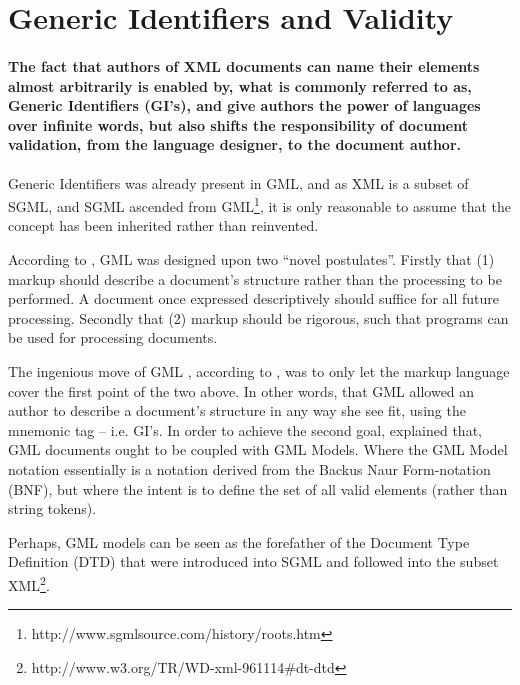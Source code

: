 \documentclass{scrreprt}
\begin{document}
\section{Generic Identifiers and Validity}
\label{sec:theory:generic-identifiers-and-validity}

\paragraph{The fact that authors of XML documents can name their elements almost arbitrarily is enabled by, what is commonly referred to as, Generic Identifiers (GI's), and give authors the power of languages over infinite words, but also shifts the responsibility of document validation, from the language designer, to the document author.}

Generic Identifiers was already present in GML, and as XML is a subset of SGML, and SGML ascended from GML\footnote{http://www.sgmlsource.com/history/roots.htm}, it is only reasonable to assume that the concept has been inherited rather than reinvented.

According to \citet{goldfarb}, GML was designed upon two ``novel postulates''. Firstly that (1) markup should describe a document's structure rather than the processing to be performed. A document once expressed descriptively should suffice for all future processing. Secondly that (2) markup should be rigorous, such that programs can be used for processing documents.


The ingenious move of GML , according to \citet{goldfarb}, was to only let the markup language cover the first point of the two above. In other words, that GML allowed an author to describe a document's structure in any way she see fit, using the mnemonic tag -- i.e. GI's. In order to achieve the second goal, \citet{goldfarb} explained that, GML documents ought to be coupled with GML Models. Where the GML Model notation essentially is a notation derived from the Backus Naur Form-notation (BNF), but where the intent is to define the set of all valid elements (rather than string tokens).

Perhaps, GML models can be seen as the forefather of the Document Type Definition (DTD) that were introduced into SGML and followed into the subset XML\footnote{http://www.w3.org/TR/WD-xml-961114\#dt-dtd}.
\end{document}
